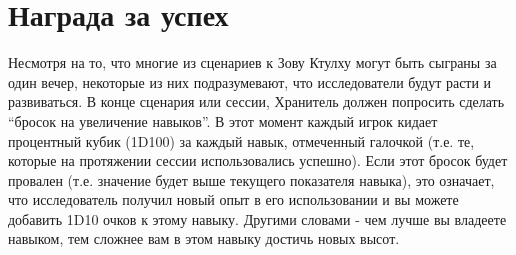 \documentclass[letterpaper,twocolumn,openany, twoside, 11pt, usenames]{cocbook}
\begin{document}
\section*{Награда за успех}

Несмотря на то, что многие из сценариев к Зову Ктулху могут быть сыграны за один вечер, некоторые из них подразумевают, что исследователи будут расти и развиваться. В конце сценария или сессии, Хранитель должен попросить сделать ``бросок на увеличение навыков''. В этот момент каждый игрок кидает процентный кубик (1D100) за каждый навык, отмеченный галочкой (т.е. те, которые на протяжении сессии использовались успешно). Если этот бросок будет провален (т.е. значение будет выше текущего показателя навыка), это означает, что исследователь получил новый опыт в его использовании и вы можете добавить 1D10 очков к этому навыку. Другими словами - чем лучше вы владеете навыком, тем сложнее вам в этом навыку достичь новых высот.

\smallbreak
\noindent {}
\end{document}
